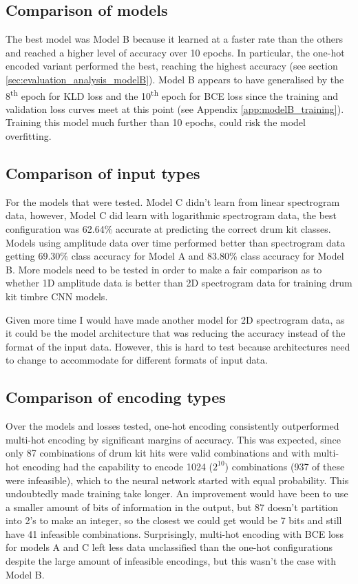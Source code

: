 \documentclass[12pt]{article}
\begin{document}
	\subsection{Comparison of models}
	The best model was Model B because it learned at a faster rate than the others and reached a higher level of accuracy over 10 epochs. In particular, the one-hot encoded variant performed the best, reaching the highest accuracy (see section \ref{sec:evaluation_analysis_modelB}). Model B appears to have generalised by the 8\textsuperscript{th} epoch for KLD loss and the 10\textsuperscript{th} epoch for BCE loss since the training and validation loss curves meet at this point (see Appendix \ref{app:modelB_training}). Training this model much further than 10 epochs, could risk the model overfitting.\medskip
	
	\subsection{Comparison of input types}
	
	For the models that were tested. Model C didn't learn from linear spectrogram data, however, Model C did learn with logarithmic spectrogram data, the best configuration was 62.64\% accurate at predicting the correct drum kit classes. Models using amplitude data over time performed better than spectrogram data getting 69.30\% class accuracy for Model A and 83.80\% class accuracy for Model B. More models need to be tested in order to make a fair comparison as to whether 1D amplitude data is better than 2D spectrogram data for training drum kit timbre CNN models.\medskip
	
	Given more time I would have made another model for 2D spectrogram data, as it could be the model architecture that was reducing the accuracy instead of the format of the input data. However, this is hard to test because architectures need to change to accommodate for different formats of input data.\medskip
	
	\subsection{Comparison of encoding types}
	
	Over the models and losses tested, one-hot encoding consistently outperformed multi-hot encoding by significant margins of accuracy. This was expected, since only 87 combinations of drum kit hits were valid combinations and with multi-hot encoding had the capability to encode 1024 ($2^{10}$) combinations (937 of these were infeasible), which to the neural network started with equal probability. This undoubtedly made training take longer. An improvement would have been to use a smaller amount of bits of information in the output, but 87 doesn't partition into 2's to make an integer, so the closest we could get would be 7 bits and still have 41 infeasible combinations. Surprisingly, multi-hot encoding with BCE loss for models A and C left less data unclassified than the one-hot configurations despite the large amount of infeasible encodings, but this wasn't the case with Model B.\medskip
	
\end{document}
